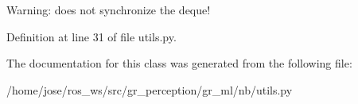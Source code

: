 \begin{DoxyVerb}Warning: does not synchronize the deque!
\end{DoxyVerb}
 

Definition at line 31 of file utils.\+py.



The documentation for this class was generated from the following file\+:\begin{DoxyCompactItemize}
\item 
/home/jose/ros\+\_\+ws/src/gr\+\_\+perception/gr\+\_\+ml/nb/utils.\+py\end{DoxyCompactItemize}
